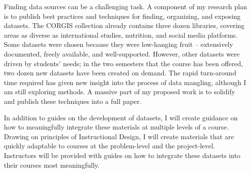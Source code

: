 Finding data sources can be a challenging task.
A component of my research plan is to publish best practices and techniques for finding, organizing, and exposing datasets.
The CORGIS collection already contains three dozen libraries, covering areas as diverse as international studies, nutrition, and social media platforms.
Some datasets were chosen because they were low-hanging fruit -- extensively documented, freely available, and well-supported. 
However, other datasets were driven by students' needs; in the two semesters that the course has been offered, two dozen new datasets have been created on demand.
The rapid turn-around time required has given new insight into the process of data mangling, although I am still exploring methods.
A massive part of my proposed work is to solidify and publish these techniques into a full paper.

In addition to guides on the development of datasets, I will create guidance on how to meaningfully integrate these materials at multiple levels of a course.
Drawing on principles of Instructional Design, I will create materials that are quickly adaptable to courses at the problem-level and the project-level.
Instructors will be provided with guides on how to integrate these datasets into their courses most meaningfully.